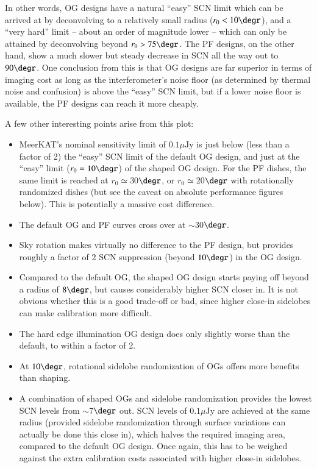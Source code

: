 \documentclass{aa}
\begin{document}
In other words, OG designs have a natural ``easy'' SCN limit which can be arrived at by deconvolving to a relatively small radius ($r_0<10\degr$), and a ``very hard'' limit -- about an order of magnitude lower -- which can only be attained by deconvolving beyond $r_0>75\degr$. The PF designs, on the other hand, show a much slower but steady decrease in SCN all the way out to $90\degr$. One conclusion from this is that OG designs are far superior in terms of imaging cost as long as the  interferometer's noise floor (as determined by thermal noise and confusion) is above the ``easy'' SCN limit, but if a lower noise floor is available, the PF designs can reach it more cheaply.

A few other interesting points arise from this plot:

\begin{itemize}
  \item MeerKAT's nominal sensitivity limit of $0.1 \mu\mathrm{Jy}$ is just below (less than a factor of 2) the ``easy'' SCN limit of the default OG design, and just at the ``easy'' limit ($r_0=10\degr$) of the shaped OG design. For the PF dishes,  the same limit is reached at $r_0\simeq$30$\degr$, or $r_0\simeq$20$\degr$ with rotationally randomized dishes (but see the caveat on absolute performance figures below). This is potentially a massive cost difference.
  \item The default OG and PF curves cross over at $\sim$30$\degr$.
  \item Sky rotation makes virtually no difference to the PF design, but provides roughly a factor of 2 SCN suppression (beyond $10\degr$) in the OG design.
  \item Compared to the default OG, the shaped OG design starts paying off beyond a radius of $8\degr$, but causes considerably higher SCN closer in. It is not obvious whether this is a good trade-off or bad, since higher close-in sidelobes can make calibration more difficult.
  \item The hard edge illumination OG design does only slightly worse than the default, to within a factor of 2.
  \item At $10\degr$, rotational sidelobe randomization of OGs offers more benefits than shaping.
  \item A combination of shaped OGs and sidelobe randomization provides the lowest SCN levels from $\sim$7$\degr$ out.
  SCN levels of $0.1 \mu\mathrm{Jy}$ are achieved at the same radius (provided sidelobe randomization through surface variations can actually be done this close in), which halves the required imaging area, compared to the default OG design. Once again, this has to be weighed against the extra calibration costs associated with higher close-in sidelobes.
\end{itemize}
\end{document}
